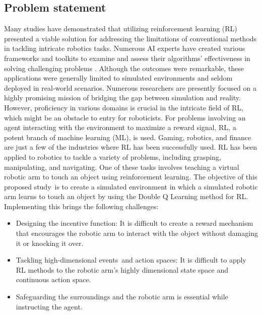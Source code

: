 \documentclass[12pt,oneside]{article}
\begin{document}


\subsection{Problem statement}

Many studies have demonstrated that utilizing reinforcement learning (RL) presented a viable solution for addressing the limitations of conventional methods in tackling intricate robotics tasks. Numerous AI experts have created various frameworks and toolkits to examine and assess their algorithms' effectiveness in solving challenging problems \cite{36_wu2020ethical}. Although the outcomes were remarkable, these applications were generally limited to simulated environments and seldom deployed in real-world scenarios. Numerous researchers are presently focused on a highly promising mission of bridging the gap between simulation and reality. However, proficiency in various domains is crucial in the intricate field of RL, which might be an obstacle to entry for roboticists.
For problems involving an agent interacting with the environment to maximize a reward signal, RL, a potent branch of machine learning (ML), is used. Gaming, robotics, and finance are just a few of the industries where RL has been successfully used. RL has been applied to robotics to tackle a variety of problems, including grasping, manipulating, and navigating. One of these tasks involves teaching a virtual robotic arm to touch an object using reinforcement learning.
The objective of this proposed study is to create a simulated environment in which a simulated robotic arm learns to touch an object by using the Double Q Learning method for RL. Implementing this brings the following challenges:
\begin{itemize}
\item Designing the incentive function: It is difficult to create a reward mechanism that encourages the robotic arm to interact with the object without damaging it or knocking it over.
\item Tackling high-dimensional events and action spaces: It is difficult to apply RL methods to the robotic arm's highly dimensional state space and continuous action space.
\item Safeguarding the surroundings and the robotic arm is essential while instructing the agent.
\end{itemize}
\end{document}
